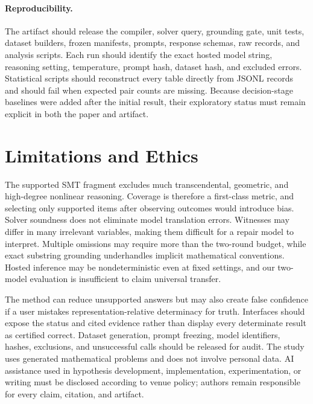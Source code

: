 \documentclass[sigconf,anonymous]{aamas}
\begin{document}
\paragraph{Reproducibility.}
The artifact should release the compiler, solver query, grounding gate, unit tests, dataset builders, frozen manifests, prompts, response schemas, raw records, and analysis scripts.  Each run should identify the exact hosted model string, reasoning setting, temperature, prompt hash, dataset hash, and excluded errors.  Statistical scripts should reconstruct every table directly from JSONL records and should fail when expected pair counts are missing.  Because decision-stage baselines were added after the initial result, their exploratory status must remain explicit in both the paper and artifact.

\section{Limitations and Ethics}
The supported SMT fragment excludes much transcendental, geometric, and high-degree nonlinear reasoning.  Coverage is therefore a first-class metric, and selecting only supported items after observing outcomes would introduce bias.  Solver soundness does not eliminate model translation errors.  Witnesses may differ in many irrelevant variables, making them difficult for a repair model to interpret.  Multiple omissions may require more than the two-round budget, while exact substring grounding underhandles implicit mathematical conventions.  Hosted inference may be nondeterministic even at fixed settings, and our two-model evaluation is insufficient to claim universal transfer.

The method can reduce unsupported answers but may also create false confidence if a user mistakes representation-relative determinacy for truth.  Interfaces should expose the status and cited evidence rather than display every determinate result as certified correct.  Dataset generation, prompt freezing, model identifiers, hashes, exclusions, and unsuccessful calls should be released for audit.  The study uses generated mathematical problems and does not involve personal data.  AI assistance used in hypothesis development, implementation, experimentation, or writing must be disclosed according to venue policy; authors remain responsible for every claim, citation, and artifact.
\end{document}
